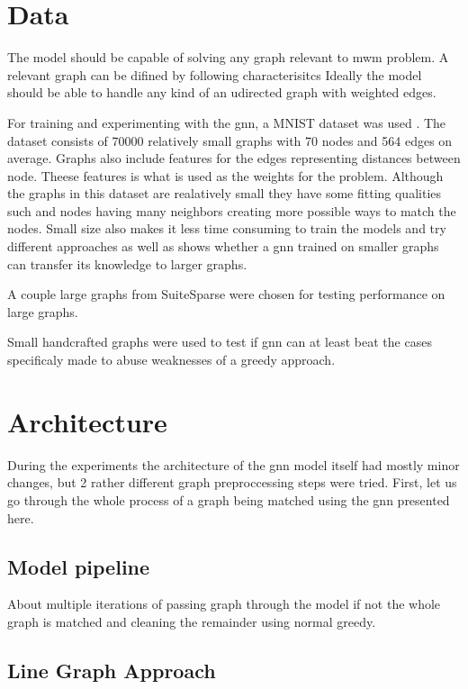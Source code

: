 \section{Data}

The model should be capable of solving any graph relevant to \gls{mwm} problem. A relevant graph can be difined by following characterisitcs
Ideally the model should be able to handle any kind of an udirected graph with weighted edges.

For training and experimenting with the \gls{gnn}, a MNIST dataset was used \cite{dwivedi2022benchmarking}. The dataset consists of 70000 relatively small graphs with 70 nodes and 564 edges on average. Graphs also include features for the edges representing distances between node. Theese features is what is used as the weights for the problem. Although the graphs in this dataset are realatively small they have some fitting qualities such and nodes having many neighbors creating more possible ways to match the nodes. Small size also makes it less time consuming to train the models and try different approaches as well as shows whether a \gls{gnn} trained on smaller graphs can transfer its knowledge to larger graphs.

A couple large graphs from SuiteSparse were chosen for testing performance on large graphs.

Small handcrafted graphs were used to test if \gls{gnn} can at least beat the cases specificaly made to abuse weaknesses of a greedy approach.

\section{Architecture}

During the experiments the architecture of the \gls{gnn} model itself had mostly minor changes, but 2 rather different graph preproccessing steps were tried. First, let us go through the whole process of a graph being matched using the \gls{gnn} presented here.

\subsection{Model pipeline}

About multiple iterations of passing graph through the model if not the whole graph is matched and cleaning the remainder using normal greedy.

\subsection{Line Graph Approach}

